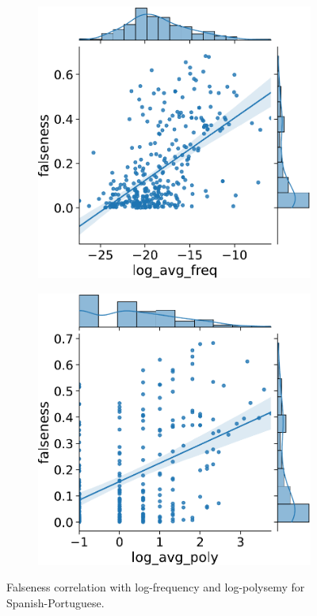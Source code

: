 \documentclass[output=paper]{langsci/langscibook}
\begin{document}
\begin{figure}[p]
    \begin{subfigure}{0.5\textwidth}\centering
    \includegraphics[width=\linewidth]{figures/UBAN_correlation_es_pt_falseness_logfreq_big.pdf}
    \end{subfigure}\begin{subfigure}{0.5\textwidth}\centering
    \includegraphics[width=\linewidth]{figures/UBAN_correlation_es_pt_falseness_logpoly_big.pdf}
    \end{subfigure}
\caption{Falseness correlation with log-frequency and log-polysemy for Spanish-Portuguese.\label{fig:scatter2}}
\end{figure}
\end{document}
